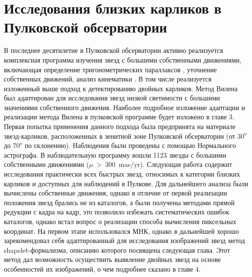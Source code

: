 \section{Исследования близких карликов в Пулковской обсерватории} \label{sec:ch1/sec3}
В последнее десятилетие в Пулковской обсерватории активно реализуется комплексная программа изучения звезд с большими собственными движениями, включающая определение тригонометрических параллаксов  , уточнение собственных движений, анализ кинематики . В том числе реализуется изложенный выше подход к детектированию двойных карликов. Метод Вилена был адаптирован для исследования звезд низкой светимости с большими значениями собственного движения. Наиболее подробное изложение адаптации и реализации метода Вилена в пулковской программе будет изложено в главе 3. Первая попытка применения данного подхода  была предпринята на материале звезд-карликов, расположенных в зенитной зоне Пулковской обсерватории (от $30^{o}$ до $70^{o}$ по склонению). Наблюдения были проведены с помощью Нормального астрографа. В наблюдательную программу вошли 1123 звезды с большими собственными движениями ($\mu$~>~300~mas/yr). Следующая работа  содержит исследования практически всех быстрых звезд, относимых к категории близких карликов и доступных для наблюдений в Пулкове. Для дальнейшего анализа были вычислены собственные движения, однако в отличие от первой реализации положения звезд брались не из каталогов, а были получены методами прямой редукции с кадра на кадр, это позволило избежать систематических ошибок каталогов, однако встал вопрос о реализации способа вычисления пиксельных координат. На первом этапе использовался МНК, однако в дальнейшей хорошо зарекомендовал себя адаптированный для исследования изображений звезд метод shapelet-формализма, описанию которого посвящена следующая глава. Этот метод дал возможность осуществить выявление двойных звезд на основе особенностей их изображений, о чем подробнее сказано в главе 4.